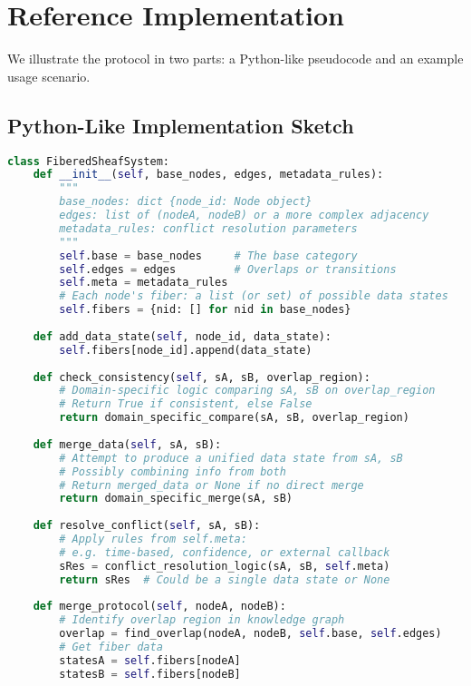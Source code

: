 \documentclass{article}
\begin{document}
\section{Reference Implementation}

We illustrate the protocol in two parts: a Python-like pseudocode and an example usage scenario.

\subsection{Python-Like Implementation Sketch}

\begin{lstlisting}[language=Python, caption=Fibered-Sheaf Merge Protocol in Pythonic Pseudocode, label=lst:python_impl]
class FiberedSheafSystem:
    def __init__(self, base_nodes, edges, metadata_rules):
        """
        base_nodes: dict {node_id: Node object}
        edges: list of (nodeA, nodeB) or a more complex adjacency
        metadata_rules: conflict resolution parameters
        """
        self.base = base_nodes     # The base category
        self.edges = edges         # Overlaps or transitions
        self.meta = metadata_rules
        # Each node's fiber: a list (or set) of possible data states
        self.fibers = {nid: [] for nid in base_nodes}
    
    def add_data_state(self, node_id, data_state):
        self.fibers[node_id].append(data_state)
    
    def check_consistency(self, sA, sB, overlap_region):
        # Domain-specific logic comparing sA, sB on overlap_region
        # Return True if consistent, else False
        return domain_specific_compare(sA, sB, overlap_region)
    
    def merge_data(self, sA, sB):
        # Attempt to produce a unified data state from sA, sB
        # Possibly combining info from both
        # Return merged_data or None if no direct merge
        return domain_specific_merge(sA, sB)
    
    def resolve_conflict(self, sA, sB):
        # Apply rules from self.meta:
        # e.g. time-based, confidence, or external callback
        sRes = conflict_resolution_logic(sA, sB, self.meta)
        return sRes  # Could be a single data state or None
    
    def merge_protocol(self, nodeA, nodeB):
        # Identify overlap region in knowledge graph
        overlap = find_overlap(nodeA, nodeB, self.base, self.edges)
        # Get fiber data
        statesA = self.fibers[nodeA]
        statesB = self.fibers[nodeB]
        

\end{lstlisting}
\end{document}
